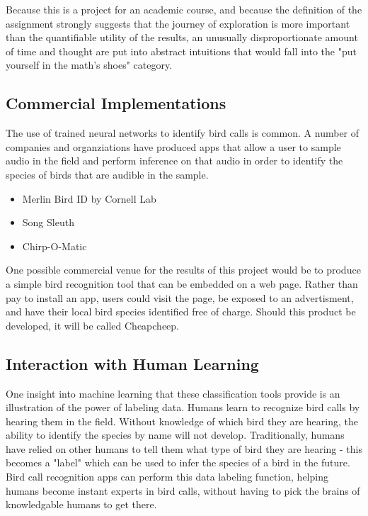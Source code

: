 \documentclass[sigconf]{acmart}
\begin{document}
Because this is a project for an academic course, and because the 
definition of the assignment strongly suggests that the journey of
exploration is more important than the quantifiable utility of the results,
an unusually disproportionate amount of time and thought are put
into abstract intuitions that would fall into the "put yourself in the math's
shoes" category.


\subsection{Commercial Implementations}

The use of trained neural networks to identify bird calls is common. A
number of companies and organziations have produced apps that allow
a user to sample audio in the field and perform inference on that audio
in order to identify the species of birds that are audible in the sample.

\begin{itemize}
\item Merlin Bird ID by Cornell Lab  \cite{Merlin20}
\item Song Sleuth \cite{songsleuth20}
\item Chirp-O-Matic \cite{chirp20}
\end{itemize}

One possible commercial venue for the results of this project would be
to produce a simple bird recognition tool that can be embedded on a web
page. Rather than pay to install an app, users could visit the page, be
exposed to an advertisment, and have their local bird species identified 
free of charge. Should this product be developed, it will be called Cheapcheep.

\subsection{Interaction with Human Learning}

One insight into machine learning that these classification tools provide is an illustration of
the power of labeling data. Humans learn to recognize bird calls by hearing them
in the field. Without knowledge of which bird they are hearing, the ability to
identify the species by name will not develop. Traditionally, humans have relied on 
other humans to tell them what type of bird they are hearing - this becomes a "label"
which can be used to infer the species of a bird in the future. Bird call recognition
apps can perform this data labeling function, helping humans become instant 
experts in bird calls, without having to pick the brains of knowledgable humans to get there.
\end{document}
